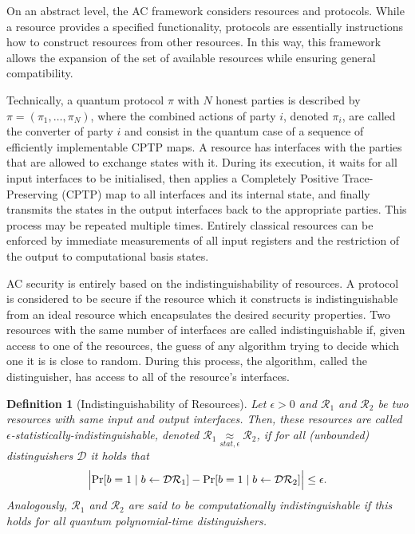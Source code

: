 \documentclass[12pt]{iopart}
\renewcommand{\1}{\mathds{1}}
\newtheorem{definition}{Definition}
\begin{document}
On an abstract level, the AC framework considers resources and protocols. While a resource provides a specified functionality, protocols are essentially instructions how to construct resources from other resources. In this way, this framework allows the expansion of the set of available resources while ensuring general compatibility.

Technically, a quantum protocol $\pi$ with $N$ honest parties is described by $\pi = (\pi_1, \ldots, \pi_N)$, where the combined actions of party $i$, denoted $\pi_i$, are called the converter of party $i$ and consist in the quantum case of a sequence of efficiently implementable CPTP maps.
A resource has interfaces with the parties that are allowed to exchange states with it. During its execution, it waits for all input interfaces to be initialised, then applies a Completely Positive Trace-Preserving (CPTP) map to all interfaces and its internal state, and finally transmits the states in the output interfaces back to the appropriate parties. This process may be repeated multiple times.
Entirely classical resources can be enforced by immediate measurements of all input registers and the restriction of the output to computational basis states.

AC security is entirely based on the indistinguishability of resources. A protocol is considered to be secure if the resource which it constructs is indistinguishable from an ideal resource which encapsulates the desired security properties.
Two resources with the same number of interfaces are called indistinguishable if, given access to one of the resources, the guess of any algorithm trying to decide which one it is is close to random.
During this process, the algorithm, called the distinguisher, has access to all of the resource's interfaces.

\begin{definition}[Indistinguishability of Resources]
\label{indist-res}
Let $\epsilon>0$  and $\mathcal{R}_1$ and $\mathcal{R}_2$ be two resources with same input and output interfaces.  
Then, these resources are called $\epsilon$-statistically-indistinguishable, denoted $\mathcal{R}_1 \!\!\!\underset{\mathit{stat}, \epsilon}{\approx}\!\!\! \mathcal{R}_2$, if for all (unbounded) distinguishers $\mathcal{D}$ it holds that
\begin{align}
\Bigl\lvert\Pr[b = 1 \mid b \leftarrow \mathcal{D}\mathcal{R}_1] - \Pr[b = 1 \mid b \leftarrow \mathcal{D}\mathcal{R}_2]\Bigr\rvert \leq \epsilon.
\end{align}
Analogously, $\mathcal{R}_1$ and $\mathcal{R}_2$ are said to be computationally indistinguishable if this holds for all quantum polynomial-time distinguishers.
\end{definition}
\end{document}
